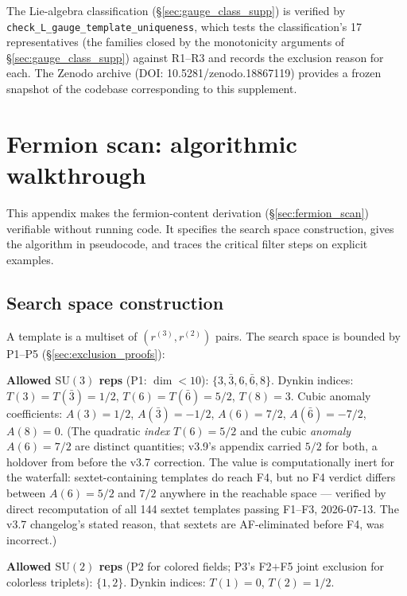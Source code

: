 \documentclass[11pt]{article}
\theoremstyle{definition}
\newcommand{\SU}{\mathrm{SU}}
\begin{document}
The Lie-algebra classification (\S\ref{sec:gauge_class_supp}) is verified by
\texttt{check\_L\_gauge\_template\_uniqueness}, which tests the
classification's 17 representatives (the families closed by the
monotonicity arguments of \S\ref{sec:gauge_class_supp}) against
R1--R3 and records the exclusion reason for each.  The Zenodo archive
(DOI: 10.5281/zenodo.18867119) provides a frozen snapshot of the
codebase corresponding to this supplement.




\section{Fermion scan: algorithmic walkthrough}
\label{app:scan_walkthrough}

This appendix makes the fermion-content derivation
(\S\ref{sec:fermion_scan}) verifiable without running code.  It
specifies the search space construction, gives the algorithm in
pseudocode, and traces the critical filter steps on explicit
examples.

\subsection{Search space construction}
\label{app:search_space}

A template is a multiset of $(r^{(3)}, r^{(2)})$ pairs.  The
search space is bounded by P1--P5 (\S\ref{sec:exclusion_proofs}):

\smallskip\noindent\textbf{Allowed $\SU(3)$ reps} (P1: $\dim < 10$):
$\{3, \bar{3}, 6, \bar{6}, 8\}$.
Dynkin indices: $T(3) = T(\bar{3}) = 1/2$, $T(6) = T(\bar{6}) = 5/2$,
$T(8) = 3$.  Cubic anomaly coefficients: $A(3) = 1/2$,
$A(\bar{3}) = -1/2$, $A(6) = 7/2$, $A(\bar{6}) = -7/2$, $A(8) = 0$.
(The quadratic \emph{index} $T(6) = 5/2$ and the cubic \emph{anomaly}
$A(6) = 7/2$ are distinct quantities; v3.9's appendix carried $5/2$
for both, a holdover from before the v3.7 correction.  The value is
computationally inert for the waterfall: sextet-containing templates
do reach F4, but no F4 verdict differs between $A(6) = 5/2$ and $7/2$
anywhere in the reachable space --- verified by direct recomputation
of all 144 sextet templates passing F1--F3, 2026-07-13.  The v3.7
changelog's stated reason, that sextets are AF-eliminated before F4,
was incorrect.)

\smallskip\noindent\textbf{Allowed $\SU(2)$ reps} (P2 for colored
fields; P3's F2$+$F5 joint exclusion for colorless triplets):
$\{1, 2\}$.  Dynkin indices: $T(1) = 0$, $T(2) = 1/2$.
\end{document}

